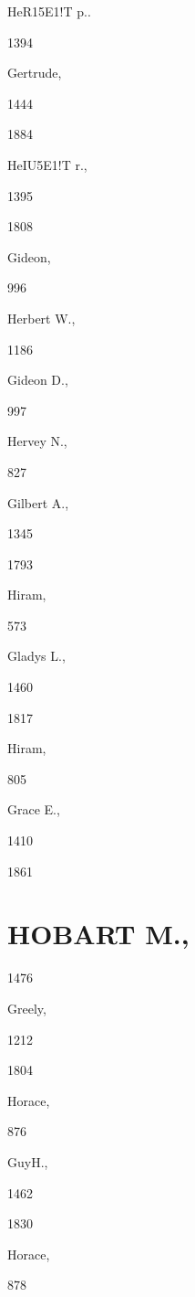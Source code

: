 {HeR15E1!T p.. 


1394 




Gertrude, 


1444 


1884 


HeIU5E1!T r., 


1395 


1808 


Gideon, 


996 




Herbert W., 


1186 




Gideon D., 


997 




Hervey N., 


827 




Gilbert A., 


1345 


1793 


Hiram, 


573 




Gladys L., 


1460 


1817 


Hiram, 


805 




Grace E., 


1410 


1861 


\chapter{HOBART M.,}

1476 




Greely, 


1212 


1804 


Horace, 


876 




GuyH., 


1462 


1830 


Horace, 


878 




}
